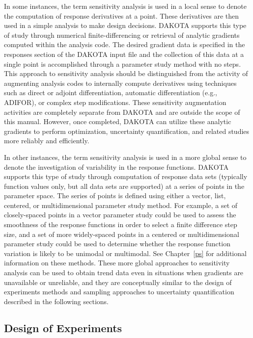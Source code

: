 In some instances, the term sensitivity analysis is used in a local
sense to denote the computation of response derivatives at a point.
These derivatives are then used in a simple analysis to make design
decisions. DAKOTA supports this type of study through numerical
finite-differencing or retrieval of analytic gradients computed within
the analysis code. The desired gradient data is specified in the
responses section of the DAKOTA input file and the collection of this
data at a single point is accomplished through a parameter study
method with no steps. This approach to sensitivity analysis should be
distinguished from the activity of augmenting analysis codes to
internally compute derivatives using techniques such as direct or
adjoint differentiation, automatic differentiation (e.g., ADIFOR), or
complex step modifications. These sensitivity augmentation activities
are completely separate from DAKOTA and are outside the scope of this
manual. However, once completed, DAKOTA can utilize these analytic
gradients to perform optimization, uncertainty quantification, and
related studies more reliably and efficiently.

In other instances, the term sensitivity analysis is used in a more
global sense to denote the investigation of variability in the
response functions. DAKOTA supports this type of study through
computation of response data sets (typically function values only, but
all data sets are supported) at a series of points in the parameter
space. The series of points is defined using either a vector, list,
centered, or multidimensional parameter study method. For example, a
set of closely-spaced points in a vector parameter study could be used
to assess the smoothness of the response functions in order to select
a finite difference step size, and a set of more widely-spaced points
in a centered or multidimensional parameter study could be used to
determine whether the response function variation is likely to be
unimodal or multimodal. See Chapter~\ref{ps} for additional
information on these methods. These more global approaches to
sensitivity analysis can be used to obtain trend data even in
situations when gradients are unavailable or unreliable, and they are
conceptually similar to the design of experiments methods and sampling
approaches to uncertainty quantification described in the following
sections.

\subsection{Design of Experiments}\label{introduction:background:design}

